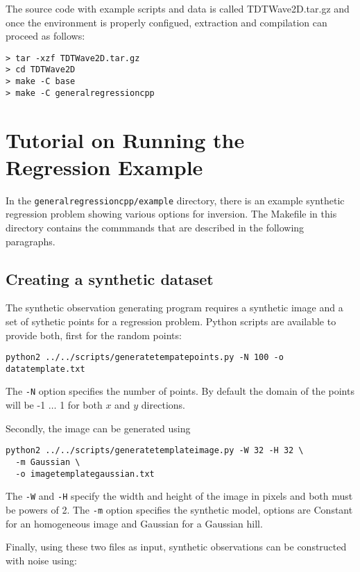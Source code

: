 \documentclass[a4paper,12pt]{article}
\begin{document}
The source code with example scripts and data is called
TDTWave2D.tar.gz and once the environment is properly
configued, extraction and compilation can proceed as follows:

\begin{verbatim}
> tar -xzf TDTWave2D.tar.gz
> cd TDTWave2D
> make -C base
> make -C generalregressioncpp
\end{verbatim}

\section{Tutorial on Running the Regression Example}

In the {\tt generalregressioncpp/example} directory, there is an example
synthetic regression problem showing various options for inversion.
The Makefile in this directory contains the commmands that are described
in the following paragraphs.

\subsection{Creating a synthetic dataset}

The synthetic observation generating program requires a synthetic
image and a set of sythetic points for a regression problem. Python scripts
are available to provide both, first for the random points:

\begin{verbatim}
python2 ../../scripts/generatetempatepoints.py -N 100 -o datatemplate.txt
\end{verbatim}

The {\tt -N} option specifies the number of points. By default the domain
of the points will be -1 $\ldots$ 1 for both $x$ and $y$ directions.

Secondly, the image can be generated using

\begin{verbatim}
python2 ../../scripts/generatetemplateimage.py -W 32 -H 32 \
  -m Gaussian \
  -o imagetemplategaussian.txt
\end{verbatim}

The {\tt -W} and {\tt -H} specify the width and height of the image in pixels
and both must be powers of 2. The {\tt -m} option specifies the synthetic
model, options are Constant for an homogeneous image and Gaussian for a Gaussian
hill.

Finally, using these two files as input, synthetic observations can be constructed
with noise using:
\end{document}
